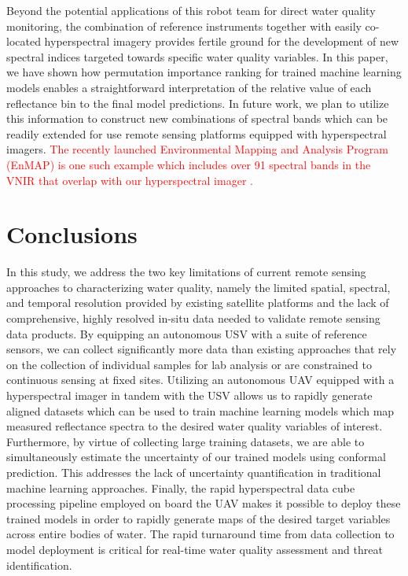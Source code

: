 \documentclass[remotesensing,article,submit,pdftex,moreauthors]{Definitions/mdpi}
\begin{document}
Beyond the potential applications of this robot team for direct water quality monitoring, the combination of reference instruments together with easily co-located hyperspectral imagery provides fertile ground for the development of new spectral indices targeted towards specific water quality variables. In this paper, we have shown how permutation importance ranking for trained machine learning models enables a straightforward interpretation of the relative value of each reflectance bin to the final model predictions. In future work, we plan to utilize this information to construct new combinations of spectral bands which can be readily extended for use remote sensing platforms equipped with hyperspectral imagers. \textcolor{red}{The recently launched Environmental Mapping and Analysis Program (EnMAP) is one such example which includes over 91 spectral bands in the VNIR that overlap with our hyperspectral imager \cite{Storch2023TheEI}.}



\section{Conclusions}

In this study, we address the two key limitations of current remote sensing approaches to characterizing water quality, namely the limited spatial, spectral, and temporal resolution provided by existing satellite platforms and the lack of comprehensive, highly resolved in-situ data needed to validate remote sensing data products. By equipping an autonomous USV with a suite of reference sensors, we can collect significantly more data than existing approaches that rely on the collection of individual samples for lab analysis or are constrained to continuous sensing at fixed sites. Utilizing an autonomous UAV equipped with a hyperspectral imager in tandem with the USV allows us to rapidly generate aligned datasets which can be used to train machine learning models which map measured reflectance spectra to the desired water quality variables of interest. Furthermore, by virtue of collecting large training datasets, we are able to simultaneously estimate the uncertainty of our trained models using conformal prediction. This addresses the lack of uncertainty quantification in traditional machine learning approaches. Finally, the rapid hyperspectral data cube processing pipeline employed on board the UAV makes it possible to deploy these trained models in order to rapidly generate maps of the desired target variables across entire bodies of water. The rapid turnaround time from data collection to model deployment is critical for real-time water quality assessment and threat identification. 
\end{document}
